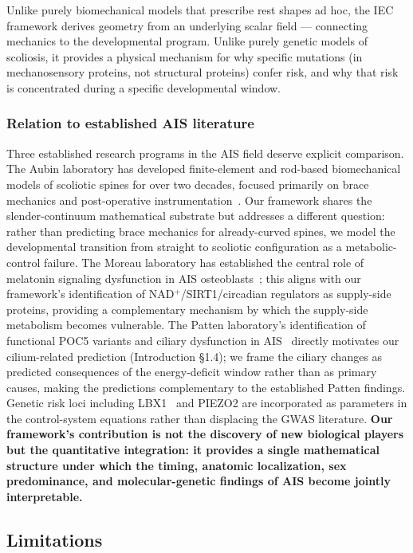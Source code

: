 Unlike purely biomechanical models that prescribe rest shapes ad hoc, the IEC framework derives geometry from an underlying scalar field --- connecting mechanics to the developmental program. Unlike purely genetic models of scoliosis, it provides a physical mechanism for why specific mutations (in mechanosensory proteins, not structural proteins) confer risk, and why that risk is concentrated during a specific developmental window.

\subsubsection*{Relation to established AIS literature}

Three established research programs in the AIS field deserve explicit comparison. The Aubin laboratory has developed finite-element and rod-based biomechanical models of scoliotic spines for over two decades, focused primarily on brace mechanics and post-operative instrumentation~\cite{aubin2004brace}. Our framework shares the slender-continuum mathematical substrate but addresses a different question: rather than predicting brace mechanics for already-curved spines, we model the developmental transition from straight to scoliotic configuration as a metabolic-control failure. The Moreau laboratory has established the central role of melatonin signaling dysfunction in AIS osteoblasts~\cite{moreau2004melatonin}; this aligns with our framework's identification of NAD$^+$/SIRT1/circadian regulators as supply-side proteins, providing a complementary mechanism by which the supply-side metabolism becomes vulnerable. The Patten laboratory's identification of functional POC5 variants and ciliary dysfunction in AIS~\cite{patten2015poc5} directly motivates our cilium-related prediction (Introduction §1.4); we frame the ciliary changes as predicted consequences of the energy-deficit window rather than as primary causes, making the predictions complementary to the established Patten findings. Genetic risk loci including LBX1~\cite{sharma2015tbx6, wise2020genetics} and PIEZO2 are incorporated as parameters in the control-system equations rather than displacing the GWAS literature. \textbf{Our framework's contribution is not the discovery of new biological players but the quantitative integration: it provides a single mathematical structure under which the timing, anatomic localization, sex predominance, and molecular-genetic findings of AIS become jointly interpretable.}

\subsection{Limitations}

